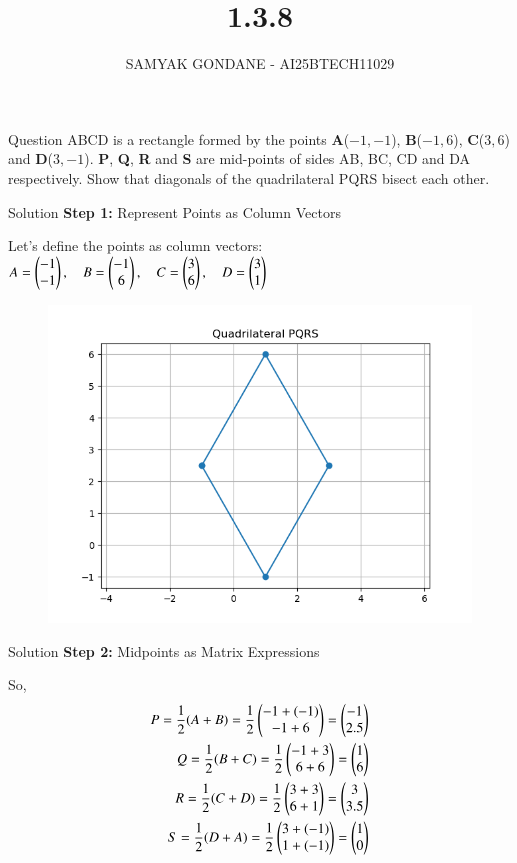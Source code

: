 \documentclass{beamer}
\title 
{1.3.8}
\date{}
\author
{SAMYAK GONDANE - AI25BTECH11029}
\begin{document}
\frame{\titlepage}
\begin{frame}{Question}
ABCD is a rectangle formed by the points \textbf{A}($-1,-1$), \textbf{B}($-1,6$), \textbf{C}($3,6$) and \textbf{D}($3,-1$). \textbf{P}, \textbf{Q}, \textbf{R} and \textbf{S} are mid-points of sides AB, BC, CD and DA respectively. Show that diagonals of the quadrilateral PQRS bisect each other.
\end{frame}



\vspace{0.5cm}

\begin{frame}{Solution}
    \textbf{Step 1:} Represent Points as Column Vectors

    Let’s define the points as column vectors:\\
    \vspace{0.3cm}
    $\begin{aligned}
    A = \myvec{-1 \\ -1}, \quad 
    B = \myvec{-1 \\ 6}, \quad 
    C = \myvec{3 \\ 6}, \quad 
    D = \myvec{3 \\ 1} 
    \end{aligned}$
    \begin{figure}[H]
        \includegraphics[width=0.5\linewidth]{./figs/Figure_1.png}
        \caption{}
        \label{fig:fig1}
    \end{figure}
\end{frame}


\begin{frame}{Solution}
\textbf{Step 2:} Midpoints as Matrix Expressions

So,
\begin{align}
P = \frac{1}{2}(A + B) = \frac{1}{2} \myvec{-1 + (-1) \\ -1 + 6} = \myvec{-1 \\ 2.5}\\
Q = \frac{1}{2}(B + C) = \frac{1}{2} \myvec{-1 + 3 \\ 6 + 6} = \myvec{1 \\ 6}\\
R = \frac{1}{2}(C + D) = \frac{1}{2} \myvec{3 + 3 \\ 6 + 1} = \myvec{3 \\ 3.5}\\
S = \frac{1}{2}(D + A) = \frac{1}{2} \myvec{3 + (-1) \\ 1 + (-1)} = \myvec{1 \\ 0}
\end{align}
\end{frame}
\end{document}
